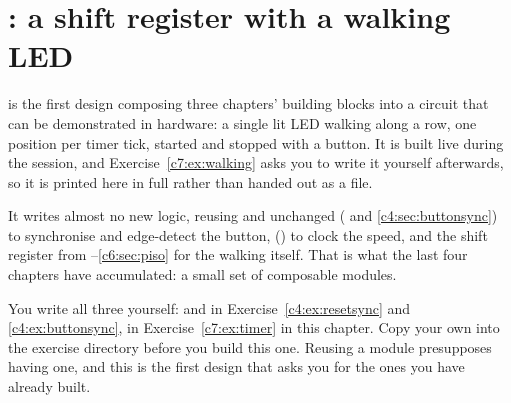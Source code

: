 \section{: a shift register with a walking LED}
\label{c7:sec:walking}

 is the first design composing three chapters' building blocks into a circuit that
can be demonstrated in hardware: a single lit LED walking along a row, one position per timer tick,
started and stopped with a button. It is built live during the session, and
Exercise~\ref{c7:ex:walking} asks you to write it yourself afterwards, so it is printed here in full
rather than handed out as a file.

It writes almost no new logic, reusing  and  unchanged
( and \ref{c4:sec:buttonsync}) to synchronise and edge-detect the button,
 () to clock the speed, and the shift register from
--\ref{c6:sec:piso} for the walking itself. That is what the last four chapters
have accumulated: a small set of composable modules.

You write all three yourself:  and  in
Exercise~\ref{c4:ex:resetsync} and \ref{c4:ex:buttonsync},  in
Exercise~\ref{c7:ex:timer} in this chapter. Copy your own into the exercise directory before you
build this one. Reusing a module presupposes having one, and this is the first design that asks you
for the ones you have already built.

